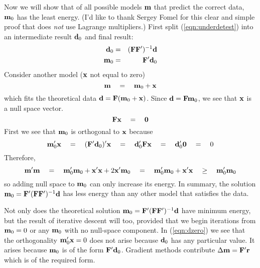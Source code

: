\par
Now we will show that of all possible models $\bold m$ that
predict the correct data, $\bold m_0$ has the least energy.
(I'd like to thank Sergey Fomel for this clear and simple proof
that does {\em  not} use Lagrange multipliers.)
First split (\ref{eqn:underdetest}) into an intermediate
result $\bold d_0$ and final result:
\begin{eqnarray}
        \bold d_0 &=& (\bold F \bold F')^{-1} \bold d
	\\
        \bold m_0 &=& \bold F' \bold d_0
\end{eqnarray}
Consider another model ($\bold x$ not equal to zero)
\begin{equation}
        \bold m \quad =\quad \bold m_0 + \bold x
\end{equation}
which fits the theoretical data
$\bold d = \bold F(\bold m_0+\bold x)$.
Since
$\bold d=\bold F\bold m_0$,
we see
that $\bold x$ is a null space vector.
\begin{equation}
        \bold F \bold x \quad =\quad \bold 0
\end{equation}
First we see that $\bold m_0$ is orthogonal to $\bold x$ because
\begin{equation}
         \bold m_0' \bold x \quad =\quad
         (\bold F' \bold d_0)' \bold x \quad =\quad
         \bold d_0' \bold F \bold x \quad =\quad
         \bold d_0' \bold 0 \quad =\quad 0
	\label{eqn:dzero}
\end{equation}
Therefore,
\begin{equation}
\bold m' \bold m \quad =\quad
\bold m_0' \bold m_0 + \bold x'\bold x + 2 \bold x' \bold m_0 \quad =\quad
\bold m_0' \bold m_0 + \bold x'\bold x \quad\ge\quad \bold m_0' \bold m_0 
\end{equation}
so adding null space to $\bold m_0$ can only increase its energy.
In summary,
the solution
$\bold m_0 = \bold F' (\bold F \bold F')^{-1} \bold d$
has less energy than any other model that satisfies the data.

\par
Not only does the theoretical solution
$\bold m_0 = \bold F' (\bold F \bold F')^{-1} \bold d$
have minimum energy,
but the result of iterative descent will too,
provided that we begin iterations from $\bold m_0=0$ or any $\bold m_0$
with no null-space component.
In (\ref{eqn:dzero}) we see that the 
orthogonality $\bold m_0'\bold x=0$
does not arise because $\bold d_0$ has any particular value.
It arises because $\bold m_0$ is of the form $\bold F'\bold d_0$.
Gradient methods contribute $\Delta\bold m =\bold F' \bold r$
which is of the required form.

